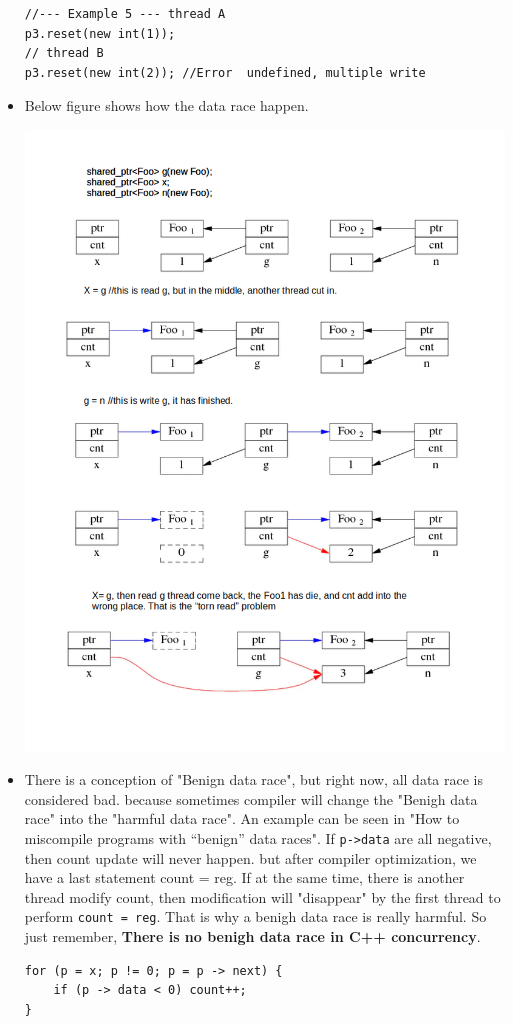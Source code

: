 \documentclass[a4paper,11pt,twoside]{book}
\begin{document}
\begin{itemize}
\begin{lstlisting}
//--- Example 5 --- thread A
p3.reset(new int(1));
// thread B
p3.reset(new int(2)); //Error  undefined, multiple write	
\end{lstlisting}


	\item Below figure shows how the data race happen. 
    
\begin{center}
		\includegraphics[width=0.80\linewidth]{pics/shared_ptr_con.png}
\end{center}

    \item There is a conception of "Benign data race", but right now, all data race is considered bad. because sometimes compiler will change the "Benigh data race" into the "harmful data race". An example can be seen in "How to miscompile programs with “benign” data races". If \texttt{p->data} are all negative, then count update will never happen. but after compiler optimization, we have a last statement count = reg.  If at the same time, there is another thread modify count, then modification will "disappear" by the first thread to perform \texttt{count = reg}. That is why a benigh data race is really harmful. So just remember, \textbf{There is no benigh data race in C++ concurrency}.
\begin{lstlisting}[]
for (p = x; p != 0; p = p -> next) {
    if (p -> data < 0) count++;
} 


\end{lstlisting}
\end{itemize}
\end{document}
